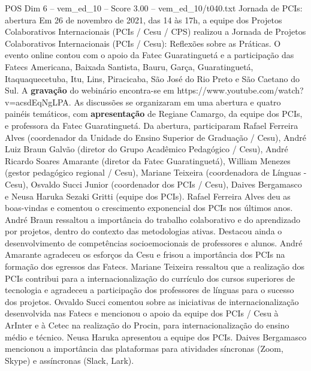 \begin{textsample}{POS Dim 6 – vem\_ed\_10 – Score 3.00 – vem\_ed\_10/t040.txt}  \label{ex:f6_pos_034}
Jornada de PCIs: abertura Em 26 de novembro de 2021, das 14 às 17h, a equipe dos Projetos Colaborativos Internacionais (PCIs / Cesu / CPS) realizou a Jornada de Projetos Colaborativos Internacionais (PCIs / Cesu): Reflexões sobre as Práticas.
O evento online contou com o apoio da Fatec Guaratinguetá e a participação das Fatecs Americana, Baixada Santista, Bauru, Garça, Guaratinguetá, Itaquaquecetuba, Itu, Lins, Piracicaba, São José do Rio Preto e São Caetano do Sul.
A \textbf{gravação} do webinário encontra-se em https://www.youtube.com/watch?v=acsdEqNgLPA.
As discussões se organizaram em uma abertura e quatro painéis temáticos, com \textbf{apresentação} de Regiane Camargo, da equipe dos PCIs, e professora da Fatec Guaratinguetá.
Da abertura, participaram Rafael Ferreira Alves (coordenador da Unidade do Ensino Superior de Graduação / Cesu), André Luiz Braun Galvão (diretor do Grupo Acadêmico Pedagógico / Cesu), André Ricardo Soares Amarante (diretor da Fatec Guaratinguetá), William Menezes (gestor pedagógico regional / Cesu), Mariane Teixeira (coordenadora de Línguas - Cesu), Osvaldo Succi Junior (coordenador dos PCIs / Cesu), Daives Bergamasco e Neusa Haruka Sezaki Gritti (equipe dos PCIs).
Rafael Ferreira Alves deu as boas-vindas e comentou o crescimento exponencial dos PCIs nos últimos anos.
André Braun ressaltou a importância do trabalho colaborativo e do aprendizado por projetos, dentro do contexto das metodologias ativas.
Destacou ainda o desenvolvimento de competências socioemocionais de professores e alunos.
André Amarante agradeceu os esforços da Cesu e frisou a importância dos PCIs na formação dos egressos das Fatecs.
Mariane Teixeira ressaltou que a realização dos PCIs contribui para a internacionalização do currículo dos cursos superiores de tecnologia e agradeceu a participação dos professores de línguas para o sucesso dos projetos.
Osvaldo Succi comentou sobre as iniciativas de internacionalização desenvolvida nas Fatecs e mencionou o apoio da equipe dos PCIs / Cesu à ArInter e à Cetec na realização do Procin, para internacionalização do ensino médio e técnico.
Neusa Haruka apresentou a equipe dos PCIs.
Daives Bergamasco mencionou a importância das plataformas para atividades síncronas (Zoom, Skype) e assíncronas (Slack, Lark).

\end{textsample}
